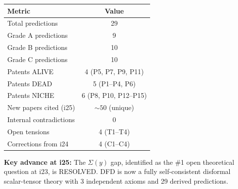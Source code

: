 \documentclass[11pt]{article}
\begin{document}
\begin{center}
\begin{tabular}{lc}
\toprule
\textbf{Metric} & \textbf{Value} \\
\midrule
Total predictions & 29 \\
Grade A predictions & 9 \\
Grade B predictions & 10 \\
Grade C predictions & 10 \\
Patents ALIVE & 4 (P5, P7, P9, P11) \\
Patents DEAD & 5 (P1--P4, P6) \\
Patents NICHE & 6 (P8, P10, P12--P15) \\
New papers cited (i25) & $\sim 50$ (unique) \\
Internal contradictions & 0 \\
Open tensions & 4 (T1--T4) \\
Corrections from i24 & 4 (C1--C4) \\
\bottomrule
\end{tabular}
\end{center}

\textbf{Key advance at i25:} The $\Sigma(y)$ gap, identified as the
\#1 open theoretical question at i23, is RESOLVED. DFD is now a
fully self-consistent disformal scalar-tensor theory with 3 independent
axioms and 29 derived predictions.
\end{document}
